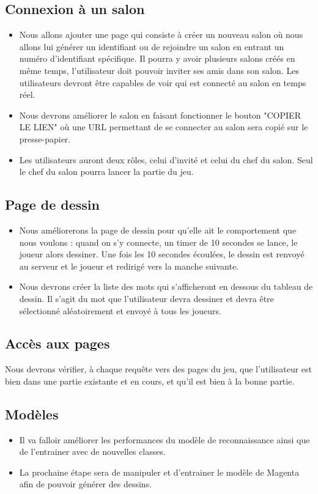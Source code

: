 \documentclass{article}
\begin{document}
\subsection{Connexion à un salon}

\begin{itemize}
    \item Nous allons ajouter une page qui consiste à créer un nouveau salon où nous allons lui générer un identifiant ou de rejoindre un salon en entrant un numéro d'identifiant spécifique. Il pourra y avoir plusieurs salons créés en même temps, l'utilisateur doit pouvoir inviter ses amis dans son salon. Les utilisateurs devront être capables de voir qui est connecté au salon en temps réel.
    \item Nous devrons améliorer le salon en faisant fonctionner le bouton "COPIER LE LIEN" où une URL permettant de se connecter au salon sera copié sur le presse-papier.
    \item Les utilisateurs auront deux rôles, celui d'invité et celui du chef du salon. Seul le chef du salon pourra lancer la partie du jeu.
\end{itemize}

\subsection{Page de dessin}

\begin{itemize}
    \item Nous améliorerons la page de dessin pour qu'elle ait le comportement que nous voulons : quand on s'y connecte, un timer de 10 secondes se lance, le joueur alors dessiner. Une fois les 10 secondes écoulées, le dessin est renvoyé au serveur et le joueur et redirigé vers la manche suivante.
    \item Nous devrons créer la liste des mots qui s'afficheront en dessous du tableau de dessin. Il s'agit du mot que l'utilisateur devra dessiner et devra être sélectionné aléatoirement et envoyé à tous les joueurs.
\end{itemize}

\subsection{Accès aux pages}

Nous devrons vérifier, à chaque requête vers des pages du jeu, que l'utilisateur est bien dans une partie existante et en cours, et qu'il est bien à la bonne partie.

\subsection{Modèles}

\begin{itemize}
    \item Il va falloir améliorer les performances du modèle de reconnaissance ainsi que de l'entrainer avec de nouvelles classes.
    \item La prochaine étape sera de manipuler et d'entrainer le modèle de Magenta afin de pouvoir générer des dessins.
\end{itemize}
\end{document}
